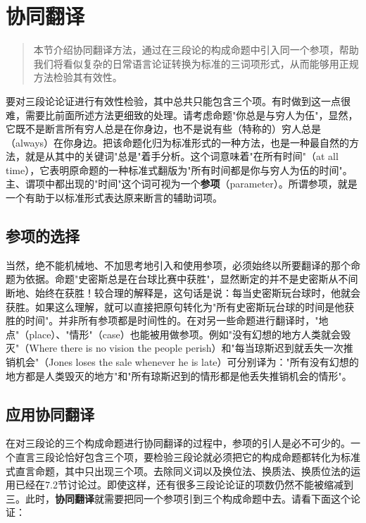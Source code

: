 \section{协同翻译}

\begin{quotation}
本节介绍协同翻译方法，通过在三段论的构成命题中引入同一个参项，帮助我们将看似复杂的日常语言论证转换为标准的三词项形式，从而能够用正规方法检验其有效性。
\end{quotation}

要对三段论论证进行有效性检验，其中总共只能包含三个项。有时做到这一点很难，需要比前面所述方法更细致的处理。请考虑命题"你总是与穷人为伍"，显然，它既不是断言所有穷人总是在你身边，也不是说有些（特称的）穷人总是（always）在你身边。把该命题化归为标准形式的一种方法，也是一种最自然的方法，就是从其中的关键词"总是"着手分析。这个词意味着"在所有时间"（at all time），它表明原命题的一种标准式翻版为"所有时间都是你与穷人为伍的时间"。主、谓项中都出现的"时间"这个词可视为一个\textbf{参项}（parameter）。所谓参项，就是一个有助于以标准形式表达原来断言的辅助词项。

\subsection{参项的选择}

当然，绝不能机械地、不加思考地引入和使用参项，必须始终以所要翻译的那个命题为依据。命题"史密斯总是在台球比赛中获胜"，显然断定的并不是史密斯从不间断地、始终在获胜！较合理的解释是，这句话是说：每当史密斯玩台球时，他就会获胜。如果这么理解，就可以直接把原句转化为"所有史密斯玩台球的时间是他获胜的时间"。并非所有参项都是时间性的。在对另一些命题进行翻译时，"地点"（place）、"情形"（case）也能被用做参项。例如"没有幻想的地方人类就会毁灭"（Where there is no vision the people perish）和"每当琼斯迟到就丢失一次推销机会"（Jones loses the sale whenever he is late）可分别译为："所有没有幻想的地方都是人类毁灭的地方"和"所有琼斯迟到的情形都是他丢失推销机会的情形"。

\subsection{应用协同翻译}

在对三段论的三个构成命题进行协同翻译的过程中，参项的引人是必不可少的。一个直言三段论恰好包含三个项，要检验三段论就必须把它的构成命题都转化为标准式直言命题，其中只出现三个项。去除同义词以及换位法、换质法、换质位法的运用已经在7.2节讨论过。即使这样，还有很多三段论论证的项数仍然不能被缩减到三。此时，\textbf{协同翻译}就需要把同一个参项引到三个构成命题中去。请看下面这个论证：

